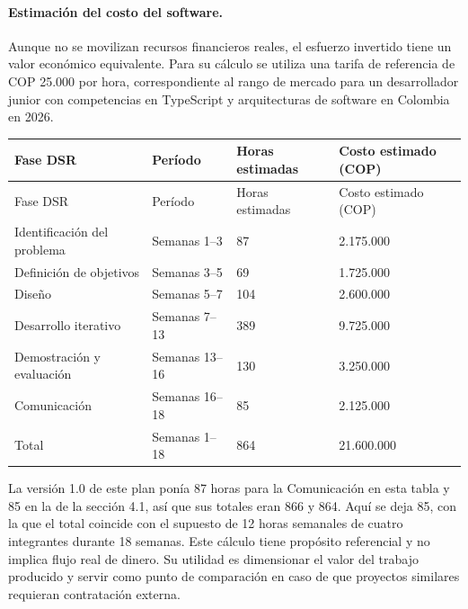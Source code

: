 \paragraph{Estimación del costo del software.}

Aunque no se movilizan recursos financieros reales, el esfuerzo invertido tiene un valor económico equivalente. Para su cálculo se utiliza una tarifa de referencia de COP 25.000 por hora, correspondiente al rango de mercado para un desarrollador junior con competencias en TypeScript y arquitecturas de software en Colombia en 2026.

\begin{center}
\renewcommand{\arraystretch}{1.2}
\SinNumero
\begin{longtable}{|P{0.282}|P{0.282}|P{0.188}|P{0.248}|}
  \hline
  Fase DSR & Período & Horas estimadas & Costo estimado (COP) \\
  \hline
  \endfirsthead
  \hline
  Fase DSR & Período & Horas estimadas & Costo estimado (COP) \\
  \hline
  \endhead
  Identificación del problema & Semanas 1–3 & 87 & 2.175.000 \\
  \hline
  Definición de objetivos & Semanas 3–5 & 69 & 1.725.000 \\
  \hline
  Diseño & Semanas 5–7 & 104 & 2.600.000 \\
  \hline
  Desarrollo iterativo & Semanas 7–13 & 389 & 9.725.000 \\
  \hline
  Demostración y evaluación & Semanas 13–16 & 130 & 3.250.000 \\
  \hline
  Comunicación & Semanas 16–18 & 85 & 2.125.000 \\
  \hline
  Total & Semanas 1–18 & 864 & 21.600.000 \\
  \hline
\end{longtable}
\end{center}

La versión 1.0 de este plan ponía 87 horas para la Comunicación en esta tabla y 85 en la de la sección 4.1, así que sus totales eran 866 y 864. Aquí se deja 85, con la que el total coincide con el supuesto de 12 horas semanales de cuatro integrantes durante 18 semanas. Este cálculo tiene propósito referencial y no implica flujo real de dinero. Su utilidad es dimensionar el valor del trabajo producido y servir como punto de comparación en caso de que proyectos similares requieran contratación externa.
